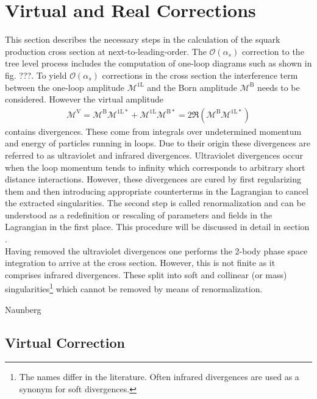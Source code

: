 \section{Virtual and Real Corrections}
This section describes the necessary steps in the calculation of the squark production cross section at next-to-leading-order. The $\mathcal{O}(\alpha_s)$ correction to the tree level process includes the computation of one-loop diagrams such as shown in fig. ???. To yield $\mathcal{O}(\alpha_s)$ corrections in the cross section the interference term between the one-loop amplitude $\mathcal{M}^{\mathrm{1L}}$ and the Born amplitude $\mathcal{M}^{\mathrm{B}}$ needs to be considered. However the virtual amplitude 
\begin{align}
\mathcal{M}^{\mathrm{V}} = \mathcal{M}^{\mathrm{B}} \mathcal{M}^{\mathrm{1L}\ast} + \mathcal{M}^{\mathrm{1L}} \mathcal{M}^{\mathrm{B}\ast} = 2 \Re \left( \mathcal{M}^{\mathrm{B}} \mathcal{M}^{\mathrm{1L}\ast} \right)
\end{align}
contains divergences. These come from integrals over undetermined momentum and energy of particles running in loops. Due to their origin these divergences are referred to as ultraviolet and infrared divergences.
Ultraviolet divergences occur when the loop momentum tends to infinity which corresponds to arbitrary short distance interactions. However, these divergences are cured by first regularizing them and then introducing appropriate counterterms in the Lagrangian to cancel the extracted singularities. The second step is called renormalization and can be understood as a redefinition or rescaling of parameters and fields in the Lagrangian in the first place. This procedure will be discussed in detail in section \label{sec:renMRSSM}.\\
Having removed the ultraviolet divergences one performs the 2-body phase space integration to arrive at the cross section. However, this is not finite as it comprises infrared divergences. These split into soft and collinear (or mass) singularities\footnote{The names differ in the literature. Often infrared divergences are used as a synonym for soft divergences.} which cannot be removed by means of renormalization.


Naunberg 


\subsection{Virtual Correction}